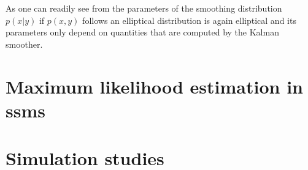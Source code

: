 \begin{theorem}
    \label{thm:elliptical-conditional}
\end{theorem}

As one can readily see from  the parameters of the smoothing distribution $p(x|y)$ if $p(x,y)$ follows an elliptical distribution is again elliptical and its parameters only depend on quantities that are computed by the Kalman smoother. 



\section{Maximum likelihood estimation in \glspl{ssm}}
\label{sec:maximum_likelihood_estimation}

\section{Simulation studies}
\label{sec:simulation_studies}